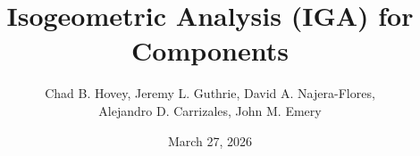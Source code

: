 \documentclass[12pt,report,justified]{SANDreport}
\title{Isogeometric Analysis (IGA) for Components}
\author{Chad B. Hovey, Jeremy L. Guthrie, David A. Najera-Flores, \\ Alejandro D. Carrizales, John M. Emery}
\date{March 27, 2026}
\begin{document}
    \maketitle

%
\begin{abstract}
% 
% 
% 
% 
% 
\end{abstract}

%
\tableofcontents
\listoffigures
\listoftables


%
\SANDmain		%

\end{document}
